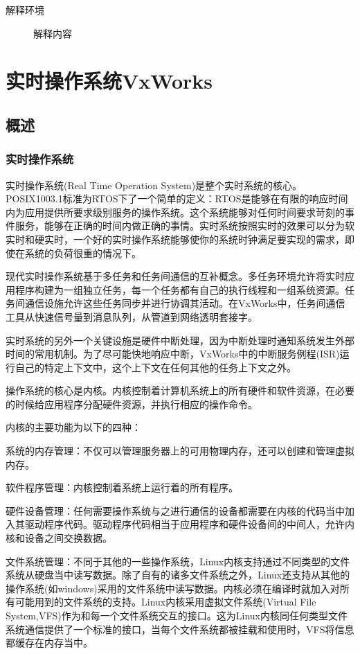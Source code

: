 \documentclass[format=draft,language=chinese,degree=master]{hustthesis}
\begin{document}
\begin{description}
    \item[解释环境]  解释内容
\end{description}



\clearpage
\chapter{实时操作系统VxWorks}
\section{概述}
\subsection{实时操作系统}
实时操作系统(Real Time Operation System)是整个实时系统的核心。POSIX1003.1标准为RTOS下了一个简单的定义：RTOS是能够在有限的响应时间内为应用提供所要求级别服务的操作系统\cite{Renard20081003}。这个系统能够对任何时间要求苛刻的事件服务，能够在正确的时间内做正确的事情。实时系统按照实时的效果可以分为软实时和硬实时，一个好的实时操作系统能够使你的系统时钟满足要实现的需求，即使在系统的负荷很重的情况下。

现代实时操作系统基于多任务和任务间通信的互补概念。多任务环境允许将实时应用程序构建为一组独立任务，每一个任务都有自己的执行线程和一组系统资源。任务间通信设施允许这些任务同步并进行协调其活动。在VxWorks中，任务间通信工具从快速信号量到消息队列，从管道到网络透明套接字。

	实时系统的另外一个关键设施是硬件中断处理，因为中断处理时通知系统发生外部时间的常用机制。为了尽可能快地响应中断，VxWorks中的中断服务例程(ISR)运行自己的特定上下文中，这个上下文在任何其他的任务上下文之外\cite{Wind2003VxWorks}。

操作系统的核心是内核。内核控制着计算机系统上的所有硬件和软件资源，在必要的时候给应用程序分配硬件资源，并执行相应的操作命令。

	内核的主要功能为以下的四种：

\bullet 系统的内存管理：不仅可以管理服务器上的可用物理内存，还可以创建和管理虚拟内存。

\bullet 软件程序管理：内核控制着系统上运行着的所有程序。

\bullet 硬件设备管理：任何需要操作系统与之进行通信的设备都需要在内核的代码当中加入其驱动程序代码。驱动程序代码相当于应用程序和硬件设备间的中间人，允许内核和设备之间交换数据。

\bullet 文件系统管理：不同于其他的一些操作系统，Linux内核支持通过不同类型的文件系统从硬盘当中读写数据。除了自有的诸多文件系统之外，Linux还支持从其他的操作系统(如windows)采用的文件系统中读写数据。内核必须在编译时就加入对所有可能用到的文件系统的支持。Linux内核采用虚拟文件系统(Virtual File System,VFS)作为和每一个文件系统交互的接口。这为Linux内核同任何类型文件系统通信提供了一个标准的接口，当每个文件系统都被挂载和使用时，VFS将信息都缓存在内存当中。
\end{document}
